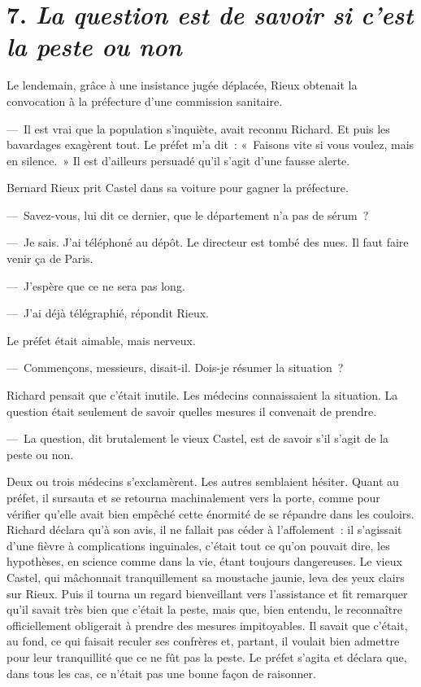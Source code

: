 \documentclass[french,twoside]{book} %
\begin{document}
\section[{7. La question est de savoir si c’est la peste ou non}]{7. \emph{La question est de savoir si c’est la peste ou non}}
\noindent Le lendemain, grâce à une insistance jugée déplacée, Rieux obtenait la convocation à la préfecture d’une commission sanitaire.\par
— Il est vrai que la population s’inquiète, avait reconnu Richard. Et puis les bavardages exagèrent tout. Le préfet m’a dit : « Faisons vite si vous voulez, mais en silence. » Il est d’ailleurs persuadé qu’il s’agit d’une fausse alerte.\par
Bernard Rieux prit Castel dans sa voiture pour gagner la préfecture.\par
— Savez-vous, lui dit ce dernier, que le département n’a pas de sérum ?\par
— Je sais. J’ai téléphoné au dépôt. Le directeur est tombé des nues. Il faut faire venir ça de Paris.\par
— J’espère que ce ne sera pas long.\par
— J’ai déjà télégraphié, répondit Rieux.\par
Le préfet était aimable, mais nerveux.\par
— Commençons, messieurs, disait-il. Dois-je résumer la situation ?\par
Richard pensait que c’était inutile. Les médecins connaissaient la situation. La question était seulement de savoir quelles mesures il convenait de prendre.\par
— La question, dit brutalement le vieux Castel, est de savoir s’il s’agit de la peste ou non.\par
Deux ou trois médecins s’exclamèrent. Les autres semblaient hésiter. Quant au préfet, il sursauta et se retourna machinalement vers la porte, comme pour vérifier qu’elle avait bien empêché cette énormité de se répandre dans les couloirs. Richard déclara qu’à son avis, il ne fallait pas céder à l’affolement : il s’agissait d’une fièvre à complications inguinales, c’était tout ce qu’on pouvait dire, les hypothèses, en science comme dans la vie, étant toujours dangereuses. Le vieux Castel, qui mâchonnait tranquillement sa moustache jaunie, leva des yeux clairs sur Rieux. Puis il tourna un regard bienveillant vers l’assistance et fit remarquer qu’il savait très bien que c’était la peste, mais que, bien entendu, le reconnaître officiellement obligerait à prendre des mesures impitoyables. Il savait que c’était, au fond, ce qui faisait reculer ses confrères et, partant, il voulait bien admettre pour leur tranquillité que ce ne fût pas la peste. Le préfet s’agita et déclara que, dans tous les cas, ce n’était pas une bonne façon de raisonner.\par
\end{document}
